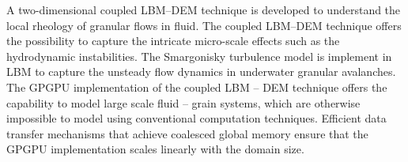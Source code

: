 A two-dimensional coupled LBM--DEM technique is developed to understand the 
local rheology of granular flows in fluid. The coupled LBM--DEM technique 
offers the possibility to capture the intricate micro-scale effects such as the 
hydrodynamic instabilities. The Smargonisky turbulence model is implement in 
LBM to capture the unsteady flow dynamics in underwater granular avalanches. 
The GPGPU implementation of the coupled LBM -- DEM technique offers the 
capability to model large scale fluid -- grain systems, which are otherwise 
impossible to model using conventional computation techniques. Efficient data 
transfer mechanisms that achieve coalesced global memory ensure that the 
GPGPU implementation scales linearly with the domain size.
